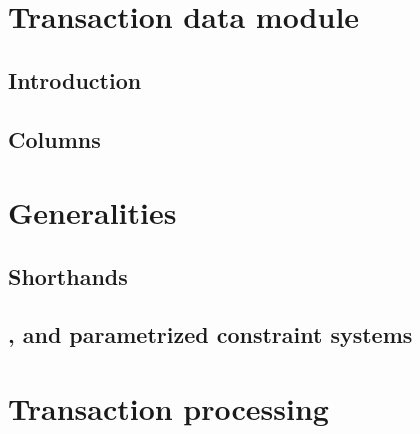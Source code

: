 
\section{Transaction data module}                                           \label{user txn data: generalities}
\subsection{Introduction}                                                   \label{user txn data: intro}                                       
\subsection{Columns}                                                        \label{user txn data: columns}                                     

\section{Generalities}                                                      \label{user txn data: generalities}                                
\subsection{Shorthands}                                                     \label{user txn data: constraints: shorthands}                     
\subsection{\wcpFlag{}, \eucFlag{} and parametrized constraint systems}     \label{user txn data: constraints: comparison constraints}         
\section{Transaction processing}                                            \label{user txn data: processing}                                  
